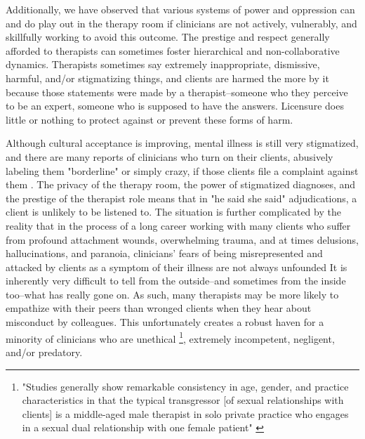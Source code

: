 \documentclass[12pt,letterpaper]{book}
\begin{document}
Additionally, we have observed that various systems of power and oppression can and do play out in the therapy room if clinicians are not actively, vulnerably, and skillfully working to avoid this outcome. The prestige and respect generally afforded to therapists can sometimes foster hierarchical and non-collaborative dynamics. Therapists sometimes say extremely inappropriate, dismissive, harmful, and/or stigmatizing things, and clients are harmed the more by it because those statements were made by a therapist--someone who they perceive to be an expert, someone who is supposed to have the answers. Licensure does little or nothing to protect against or prevent these forms of harm. 

Although cultural acceptance is improving, mental illness is still very stigmatized, and there are many reports of clinicians who turn on their clients, abusively labeling them "borderline" or simply crazy, if those clients file a complaint against them \cite{hook2018boundary}.
The privacy of the therapy room, the power of stigmatized diagnoses, and the prestige of the therapist role means that in "he said she said" adjudications, a client is unlikely to be listened to. The situation is further complicated by the reality that in the process of a long career working with many clients who suffer from profound attachment wounds, overwhelming trauma, and at times delusions, hallucinations, and paranoia, clinicians' fears of being misrepresented and attacked by clients as a symptom of their illness are not always unfounded \cite{gutheil1991patients,williams2000victimized} It is inherently very difficult to tell from the outside--and sometimes from the inside too--what has really gone on. As such, many therapists may be more likely to empathize with their peers \cite{hook2018boundary} than wronged clients when they hear about misconduct by colleagues. This unfortunately creates a robust haven for a minority of clinicians who are unethical \footnote{"Studies generally show remarkable consistency in age, gender, and practice characteristics in that the typical transgressor [of sexual relationships with clients] is a middle-aged male therapist in solo private practice who engages in a sexual dual relationship with one female patient" \cite{sexViolations}}, extremely incompetent, negligent, and/or predatory.
\end{document}
